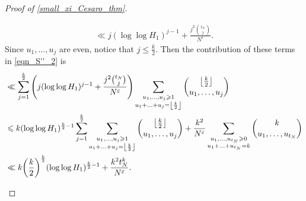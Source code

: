 \documentclass[letter,11pt]{article}
\theoremstyle{plain} %
\theoremstyle{definition} %
\theoremstyle{plain}
\theoremstyle{plain}
\theoremstyle{plain}
\numberwithin{equation}{section}
\renewcommand{\epsilon}{\varepsilon}
\renewcommand{\leq}{\leqslant}
\renewcommand{\geq}{\geqslant}
\newcommand{\1}{\mathbbm{1}}
\begin{document}
\begin{proof}[Proof of \cref{small_xi_Cesaro_thm}]
\begin{itemize}
\begin{align*}
        \ll j(\log\log{H_1})^{j-1} + \frac{j^2\binom{t_N}{j}}{N^\epsilon}.
    \end{align*}
    Since $u_1,\ldots,u_j$ are even, notice that $j\leq \frac{k}{2}$. Then the contribution of these terms in \eqref{eqn_S''_2} is 
    \begin{align}\label{eqn_2contr_S''}
        & \ll \sum_{j=1}^{\frac{k}{2}} \Bigg(j(\log\log{H_1})^{j-1}+ \frac{j^2\binom{t_N}{j}}{N^\epsilon}\Bigg) \sum_{\substack{u_1,\ldots,u_j\geq 1 \notag \\ u_1+\ldots+u_j = \left\lfloor\frac{k}{2}\right\rfloor}}\binom{\left\lfloor\frac{k}{2}\right\rfloor}{u_1,\ldots,u_j} \\
        & \leq k(\log\log{H_1})^{\frac{k}{2}-1}\sum_{j=1}^{\frac{k}{2}}\sum_{\substack{u_1,\ldots,u_j\geq 1 \\ u_1+\ldots+u_j = \left\lfloor\frac{k}{2}\right\rfloor}}\binom{\left\lfloor\frac{k}{2}\right\rfloor}{u_1,\ldots,u_j} + \frac{k^2}{N^\epsilon} \sum_{\substack{u_1,\ldots,u_{t_N}\geq 0 \\ u_1+\ldots+u_{t_N} = k}}\binom{k}{u_1,\ldots,u_{t_N}}\notag \\
        & \ll k \bigg(\frac{k}{2}\bigg)^{\frac{k}{2}} (\log\log{H_1})^{\frac{k}{2}-1} + \frac{k^2 t_N^k}{N^\epsilon}.
    \end{align}
\end{itemize}


\end{proof}
\end{document}
